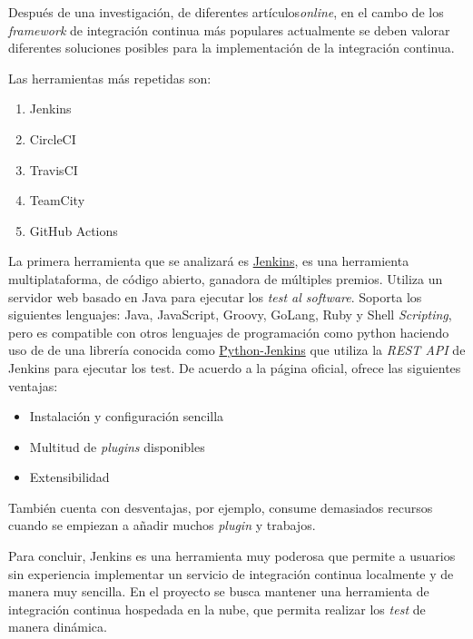 Después de una investigación, de diferentes artículos\emph{online}, en el cambo de los \emph{framework} de integración continua más populares actualmente se deben valorar diferentes soluciones posibles para la implementación de la integración continua. \cite{CIKumar2023}\cite{CITaylor2023}\cite{CIRoddewig2023}

Las herramientas más repetidas son:
\begin{enumerate}
    \item Jenkins
    \item CircleCI
    \item TravisCI
    \item TeamCity
    \item GitHub Actions
\end{enumerate}

La primera herramienta que se analizará es \href{https://www.jenkins.io/}{Jenkins}, es una herramienta multiplataforma, de código abierto, ganadora de múltiples premios. Utiliza un servidor web basado en Java para ejecutar los \emph{test al software}. Soporta los siguientes lenguajes: Java, JavaScript, Groovy, GoLang, Ruby y Shell \emph{Scripting}, pero es compatible con otros lenguajes de programación como \Gls{python} haciendo uso de de una librería conocida como \href{https://python-jenkins.readthedocs.io/en/latest/index.html}{Python-Jenkins} que utiliza la \emph{REST API} de Jenkins para ejecutar los test. De acuerdo a la página oficial, ofrece las siguientes ventajas: \cite{polkhovskiy2016comparison}
\begin{itemize}
    \item Instalación y configuración sencilla
    \item Multitud de \emph{plugins} disponibles
    \item Extensibilidad
\end{itemize}

También cuenta con desventajas, por ejemplo, consume demasiados recursos cuando se empiezan a añadir muchos \emph{plugin} y trabajos.

Para concluir, Jenkins es una herramienta muy poderosa que permite a usuarios sin experiencia implementar un servicio de integración continua localmente y de manera muy sencilla. En el proyecto se busca mantener una herramienta de integración continua hospedada en la nube, que permita realizar los \emph{test} de manera dinámica.


